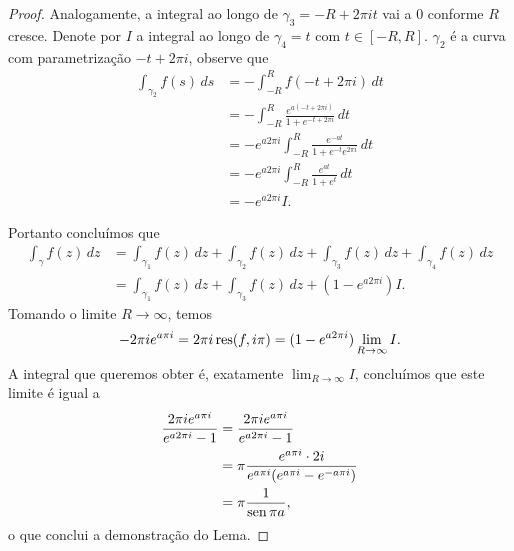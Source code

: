 \begin{proof}
        Analogamente, a integral ao longo de $\gamma_3 = -R + 2\pi i t$ vai a $0$ conforme $R$ cresce. Denote por $I$ a integral ao longo de $\gamma_4 = t$ com $t \in [-R,R]$. $\gamma_2$ é a curva com parametrização $-t + 2\pi i$, observe que
        \begin{align*}
            \int_{\gamma_2}f(s) \, ds &= -\int_{-R}^{R}f(-t + 2\pi i) \, dt \\
            &= -\int_{-R}^{R}\frac{e^{a(-t + 2 \pi i)}}{1 + e^{-t + 2\pi i}} \, dt \\
            &= -e^{a2\pi i}\int_{-R}^{R}\frac{e^{-at}}{1 + e^{-t}e^{2\pi i}} \, dt \\
            &= -e^{a2\pi i}\int_{-R}^{R}\frac{e^{at}}{1 + e^{t}} \, dt \\
            &= -e^{a2\pi i}I.
        \end{align*}
        
        Portanto concluímos que 
        \begin{align*}
        \int_\gamma f(z) \, dz &= \int_{\gamma_1} f(z) \, dz + \int_{\gamma_2} f(z) \, dz + \int_{\gamma_3} f(z) \, dz + \int_{\gamma_4} f(z) \, dz \\
        &= \int_{\gamma_1} f(z) \, dz + \int_{\gamma_3} f(z) \, dz + (1 - e^{a 2\pi i}) I.
        \end{align*}
        Tomando o limite $R \to \infty$, temos
        $$-2\pi ie^{a\pi i} = 2\pi i \operatorname{res}(f,i\pi) = (1 - e^{a 2\pi i}) \lim_{R \to \infty}I.$$
        A integral que queremos obter é, exatamente $\lim_{R \to \infty}I$, concluímos que este limite é igual a
        \begin{align*}
            \frac{2\pi ie^{a\pi i}}{e^{a 2\pi i} - 1} &= \frac{2\pi ie^{a\pi i}}{e^{a 2\pi i} - 1} \\
            &= \pi \frac{ e^{a\pi i} \cdot 2i}{e^{a \pi i}(e^{a \pi i} - e^{-a \pi i})}\\
            &= \pi \frac{1}{\operatorname{sen} \pi a},
        \end{align*}
        o que conclui a demonstração do Lema.
    \end{proof}
    
